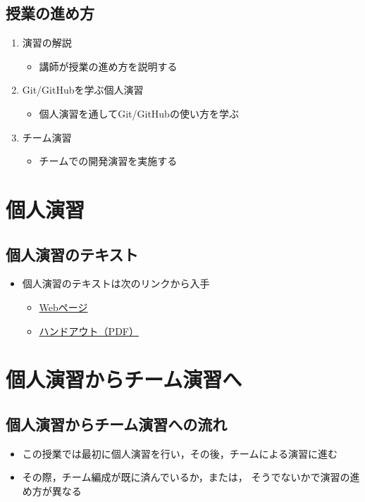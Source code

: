 \documentclass[a4paper,twoside,twocolumn]{bxjsarticle}
\begin{document}
\subsection{授業の進め方}
\label{sec-1-5}
\begin{enumerate}
\item 演習の解説
\begin{itemize}
\item 講師が授業の進め方を説明する
\end{itemize}
\item Git/GitHubを学ぶ個人演習
\begin{itemize}
\item 個人演習を通してGit/GitHubの使い方を学ぶ
\end{itemize}
\item チーム演習
\begin{itemize}
\item チームでの開発演習を実施する
\end{itemize}
\end{enumerate}

\section{個人演習}
\label{sec-2}
\subsection{個人演習のテキスト}
\label{sec-2-1}
\begin{itemize}
\item 個人演習のテキストは次のリンクから入手
\begin{itemize}
\item \href{https://github.com/ychubachi/github_practice/blob/master/github_practice-person_handout.org}{Webページ}
\item \href{https://github.com/ychubachi/github_practice/raw/master/github_practice-person_handout.pdf}{ハンドアウト（PDF）}
\end{itemize}
\end{itemize}

\section{個人演習からチーム演習へ}
\label{sec-3}
\subsection{個人演習からチーム演習への流れ}
\label{sec-3-1}
\begin{itemize}
\item この授業では最初に個人演習を行い，その後，チームによる演習に進む
\item その際，チーム編成が既に済んでいるか，または，
そうでないかで演習の進め方が異なる
\end{itemize}
\end{document}
